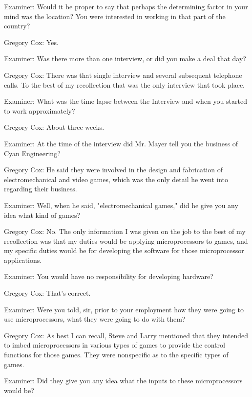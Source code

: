\textcolor{interviewer}{Examiner:} Would it be proper to say that perhaps the determining factor in your mind was the location? You were interested in working in that part of the country? 

\textcolor{interviewee}{Gregory Cox:} Yes. 

\textcolor{interviewer}{Examiner:} Was there more than one interview, or did you make a deal that day? 

\textcolor{interviewee}{Gregory Cox:} There was that single interview and several subsequent telephone calls. To the best of my recollection that was the only interview that took place.

\textcolor{interviewer}{Examiner:} What was the time lapse between the Interview and when you started to work approximately? 

\textcolor{interviewee}{Gregory Cox:} About three weeks. 

\textcolor{interviewer}{Examiner:} At the time of the interview did Mr. Mayer tell you the business of Cyan Engineering? 

\textcolor{interviewee}{Gregory Cox:} He said they were involved in the design and fabrication of electromechanical and video games, which was the only detail he went into regarding their business. 

\textcolor{interviewer}{Examiner:} Well, when he said, "electromechanical games," did he give you any idea what kind of games? 

\textcolor{interviewee}{Gregory Cox:} No. The only information I was given on the job to the best of my recollection was that my duties would be applying microprocessors to games, and my specific duties would be for developing the software for those microprocessor applications. 

\textcolor{interviewer}{Examiner:} You would have no responsibility for developing hardware? 

\textcolor{interviewee}{Gregory Cox:} That’s correct. 

\textcolor{interviewer}{Examiner:} Were you told, sir, prior to your employment how they were going to use microprocessors, what they were going to do with them?

\textcolor{interviewee}{Gregory Cox:} As best I can recall, Steve and Larry mentioned that they intended to imbed microprocessors in various types of games to provide the control functions for those games. They were nonspecific as to the specific types of games.

\textcolor{interviewer}{Examiner:} Did they give you any idea what the inputs to these microprocessors would be?


